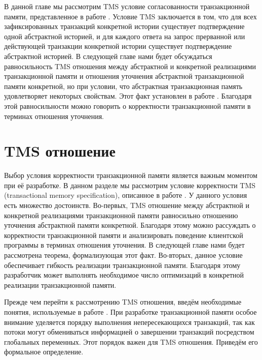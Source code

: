 В данной главе мы рассмотрим TMS условие согласованности транзакционной памяти, представленное в работе \cite{tms_article}. Условие TMS заключается в том, что для всех зафиксированных транзакций конкретной истории существует подтверждение одной абстрактной историей, и для каждого ответа на запрос прерванной или действующей транзакции конкретной истории существует подтверждение абстрактной историей. В следующей главе нами будет обсуждаться равносильность TMS отношения между абстрактной и конкретной реализациями транзакционной памяти и отношения уточнения абстрактной транзакционной памяти конкретной, но при условии, что абстрактная транзакционная память удовлетворяет некоторых свойствам. Этот факт установлен в работе \cite{tms_article}. Благодаря этой равносильности можно говорить о корректности транзакционной памяти в терминах отношения уточнения. 

\section{TMS отношение}
Выбор условия корректности транзакционной памяти является важным моментом при её разработке. В данном разделе мы рассмотрим условие корректности TMS (transactional memory specification), описанное в работе \cite{tms_article}. У данного условия есть множество достоинств. Во-первых, TMS отношение между абстрактной и конкретной реализациями транзакционной памяти равносильно отношению уточнения абстрактной памяти конкретной. Благодаря этому можно рассуждать о корректности транзакционной памяти и анализировать поведение клиентской программы в терминах отношения уточнения. В следующей главе нами будет рассмотрена теорема, формализующая этот факт. Во-вторых, данное условие обеспечивает гибкость реализации транзакционной памяти. Благодаря этому разработчик может выполнять необходимое число оптимизаций в конкретной реализации транзакционной памяти.

Прежде чем перейти к рассмотрению TMS отношения, введём необходимые понятия, используемые в работе \cite{tms_article}. При разработке транзакционной памяти особое внимание уделяется порядку выполнения непересекающихся транзакций, так как потоки могут обмениваться информацией о завершении транзакций посредством глобальных переменных. Этот порядок важен для TMS отношения. Приведём его формальное определение.

